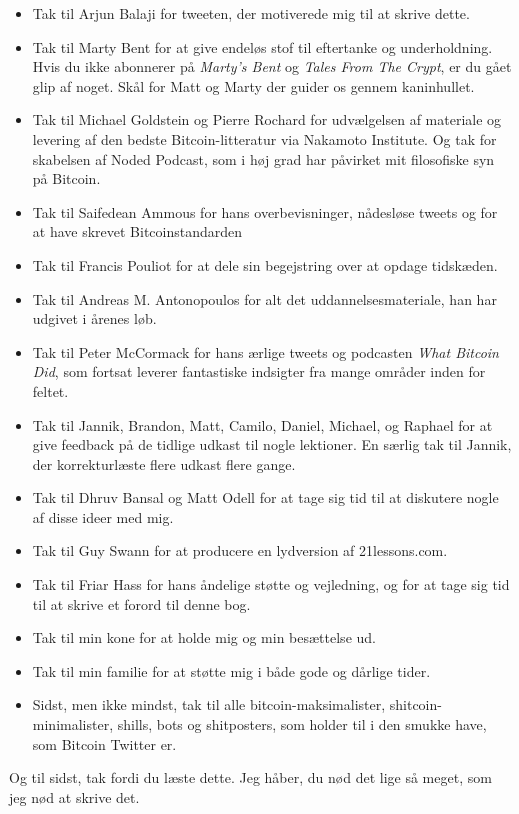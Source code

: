 \documentclass[paper=6in:9in,pagesize=pdftex,
               headinclude=on,footinclude=on,12pt]{scrbook}
\begin{document}
\begin{itemize}
  \item Tak til Arjun Balaji for tweeten, der motiverede mig til at skrive dette. \item Tak til Marty Bent for at give endeløs stof til eftertanke og underholdning. Hvis du ikke abonnerer på \textit{Marty's Bent} og \textit{Tales From The Crypt}, er du gået glip af noget. Skål for Matt og Marty der guider os gennem kaninhullet. \item Tak til Michael Goldstein og Pierre Rochard for udvælgelsen af materiale og levering af den bedste Bitcoin-litteratur via Nakamoto Institute. Og tak for skabelsen af Noded Podcast, som i høj grad har påvirket mit filosofiske syn på Bitcoin. \item Tak til Saifedean Ammous for hans overbevisninger, nådesløse tweets og for at have skrevet Bitcoinstandarden \item Tak til Francis Pouliot for at dele sin begejstring over at opdage tidskæden. \item Tak til Andreas M. Antonopoulos for alt det uddannelsesmateriale, han har udgivet i årenes løb. \item Tak til Peter McCormack for hans ærlige tweets og podcasten \textit{What Bitcoin Did}, som fortsat leverer fantastiske indsigter fra mange områder inden for feltet. \item Tak til Jannik, Brandon, Matt, Camilo, Daniel, Michael, og Raphael for at give feedback på de tidlige udkast til nogle lektioner. En særlig tak til Jannik, der korrekturlæste flere udkast flere gange. \item Tak til Dhruv Bansal og Matt Odell for at tage sig tid til at diskutere nogle af disse ideer med mig. \item Tak til Guy Swann for at producere en lydversion af 21lessons.com. \item Tak til Friar Hass for hans åndelige støtte og vejledning, og for at tage sig tid til at skrive et forord til denne bog. \item Tak til min kone for at holde mig og min besættelse ud. \item Tak til min familie for at støtte mig i både gode og dårlige tider. \item Sidst, men ikke mindst, tak til alle bitcoin-maksimalister, shitcoin-minimalister, shills, bots og shitposters, som holder til i den smukke have, som Bitcoin Twitter er. \end{itemize}

Og til sidst, tak fordi du læste dette. Jeg håber, du nød det lige så meget, som jeg nød at skrive det. 
\end{document}
